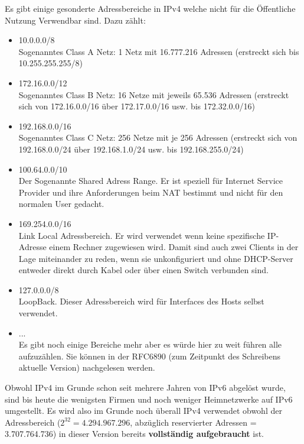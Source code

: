 \documentclass[12pt,a4paper]{report}
\begin{document}
Es gibt einige gesonderte Adressbereiche in IPv4 welche nicht für die Öffentliche Nutzung Verwendbar sind. Dazu zählt:
\begin{itemize}
\item 10.0.0.0/8\\
Sogenanntes Class A Netz: 1 Netz mit 16.777.216 Adressen (erstreckt sich bis 10.255.255.255/8)
\item 172.16.0.0/12\\
Sogenanntes Class B Netz: 16 Netze mit jeweils 65.536 Adressen (erstreckt sich von 172.16.0.0/16 über 172.17.0.0/16 usw. bis 172.32.0.0/16)
\item 192.168.0.0/16\\
Sogenanntes Class C Netz: 256 Netze mit je 256 Adressen (erstreckt sich von 192.168.0.0/24 über 192.168.1.0/24 usw. bis 192.168.255.0/24)
\item 100.64.0.0/10\\
Der Sogenannte Shared Adress Range. Er ist speziell für Internet Service Provider und ihre Anforderungen beim NAT bestimmt und nicht für den normalen User gedacht.
\item 169.254.0.0/16\\
Link Local Adressbereich. Er wird verwendet wenn keine spezifische IP-Adresse einem Rechner zugewiesen wird. Damit sind auch zwei Clients in der Lage miteinander zu reden, wenn sie unkonfiguriert und ohne DHCP-Server entweder direkt durch Kabel oder über einen Switch verbunden sind.
\item 127.0.0.0/8\\
LoopBack. Dieser Adressbereich wird für Interfaces des Hosts selbst verwendet. 
\item ...\\
Es gibt noch einige Bereiche mehr aber es würde hier zu weit führen alle aufzuzählen. Sie können in der RFC6890 (zum Zeitpunkt des Schreibens aktuelle Version) nachgelesen werden.
\end{itemize}

Obwohl IPv4 im Grunde schon seit mehrere Jahren von IPv6 abgelöst wurde, sind bis heute die wenigsten Firmen und noch weniger Heimnetzwerke auf IPv6 umgestellt. Es wird also im Grunde noch überall IPv4 verwendet obwohl der Adressbereich ($2^{32} = 4.294.967.296$, abzüglich reservierter Adressen = 3.707.764.736) in dieser Version bereits \textbf{vollständig aufgebraucht} ist.\\
\end{document}
